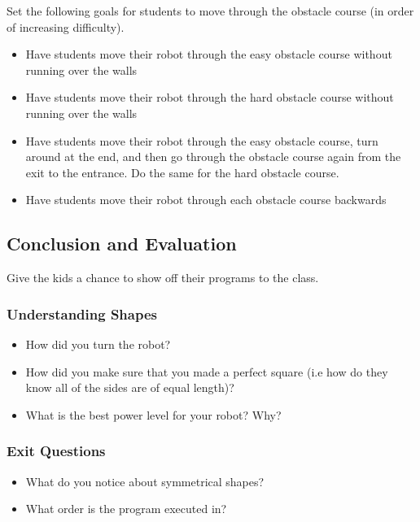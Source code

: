 \documentclass{lessonplan}
\begin{document}
	Set the following goals for students to move through the obstacle course (in order of increasing difficulty). 
	\begin{itemize}
	  \item Have students move their robot through the easy obstacle course without running over the walls
	  \item Have students move their robot through the hard obstacle course without running over the walls
	  \item Have students move their robot through the easy obstacle course, turn around at the end, and then go through the obstacle course again from the exit to the entrance. Do the same for the hard obstacle course.
	  \item Have students move their robot through each obstacle course backwards 
	\end{itemize}

    \subsection{Conclusion and Evaluation}
      Give the kids a chance to show off their programs to the class.
      \subsubsection{Understanding Shapes}
      \begin{itemize}
	\item How did you turn the robot?
	\item How did you make sure that you made a perfect square (i.e how do they know all of the sides are of equal length)?
	\item What is the best power level for your robot? Why?
      \end{itemize}
      
      \subsubsection{Exit Questions}
      \begin{itemize}
        \item What do you notice about symmetrical shapes?
        \item What order is the program executed in?
      \end{itemize}
\end{document}

